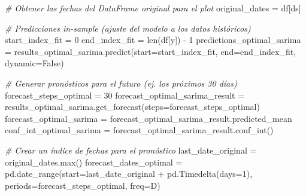 \documentclass[
  11pt,
]{article}
\newenvironment{Shaded}{}{}
\newcommand{\BuiltInTok}[1]{\textcolor[rgb]{0.00,0.50,0.00}{#1}}
\newcommand{\CommentTok}[1]{\textcolor[rgb]{0.38,0.63,0.69}{\textit{#1}}}
\newcommand{\DecValTok}[1]{\textcolor[rgb]{0.25,0.63,0.44}{#1}}
\newcommand{\NormalTok}[1]{#1}
\newcommand{\OperatorTok}[1]{\textcolor[rgb]{0.40,0.40,0.40}{#1}}
\newcommand{\StringTok}[1]{\textcolor[rgb]{0.25,0.44,0.63}{#1}}
\newcommand{\VariableTok}[1]{\textcolor[rgb]{0.10,0.09,0.49}{#1}}
\begin{document}
\begin{Shaded}
\begin{Highlighting}[]
\CommentTok{\# Obtener las fechas del DataFrame original para el plot}
\NormalTok{original\_dates }\OperatorTok{=}\NormalTok{ df[}\StringTok{\textquotesingle{}ds\textquotesingle{}}\NormalTok{]}

\CommentTok{\# Predicciones in{-}sample (ajuste del modelo a los datos históricos)}
\NormalTok{start\_index\_fit }\OperatorTok{=} \DecValTok{0}
\NormalTok{end\_index\_fit }\OperatorTok{=} \BuiltInTok{len}\NormalTok{(df[}\StringTok{\textquotesingle{}y\textquotesingle{}}\NormalTok{]) }\OperatorTok{{-}} \DecValTok{1}
\NormalTok{predictions\_optimal\_sarima }\OperatorTok{=}\NormalTok{ results\_optimal\_sarima.predict(start}\OperatorTok{=}\NormalTok{start\_index\_fit, end}\OperatorTok{=}\NormalTok{end\_index\_fit, dynamic}\OperatorTok{=}\VariableTok{False}\NormalTok{)}

\CommentTok{\# Generar pronósticos para el futuro (ej. los próximos 30 días)}
\NormalTok{forecast\_steps\_optimal }\OperatorTok{=} \DecValTok{30}
\NormalTok{forecast\_optimal\_sarima\_result }\OperatorTok{=}\NormalTok{ results\_optimal\_sarima.get\_forecast(steps}\OperatorTok{=}\NormalTok{forecast\_steps\_optimal)}
\NormalTok{forecast\_optimal\_sarima }\OperatorTok{=}\NormalTok{ forecast\_optimal\_sarima\_result.predicted\_mean}
\NormalTok{conf\_int\_optimal\_sarima }\OperatorTok{=}\NormalTok{ forecast\_optimal\_sarima\_result.conf\_int()}

\CommentTok{\# Crear un índice de fechas para el pronóstico}
\NormalTok{last\_date\_original }\OperatorTok{=}\NormalTok{ original\_dates.}\BuiltInTok{max}\NormalTok{()}
\NormalTok{forecast\_dates\_optimal }\OperatorTok{=}\NormalTok{ pd.date\_range(start}\OperatorTok{=}\NormalTok{last\_date\_original }\OperatorTok{+}\NormalTok{ pd.Timedelta(days}\OperatorTok{=}\DecValTok{1}\NormalTok{), periods}\OperatorTok{=}\NormalTok{forecast\_steps\_optimal, freq}\OperatorTok{=}\StringTok{\textquotesingle{}D\textquotesingle{}}\NormalTok{)}


\end{Highlighting}
\end{Shaded}
\end{document}
